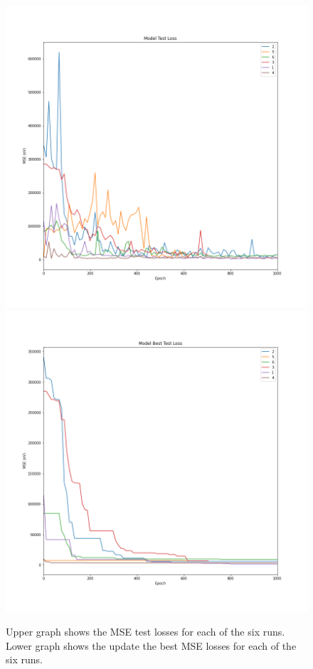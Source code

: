 \documentclass[12pt, abstract = true]{scrartcl}
\begin{document}
\begin{figure}
  \centering
  \includegraphics[scale=.35]{test.png}
  \includegraphics[scale=.35]{best.png}
  
  \caption{Upper graph shows the MSE test losses for each of the six runs. Lower graph shows the update the best MSE losses for each of the six runs.}\label{fig:graph}
\end{figure}
\end{document}
